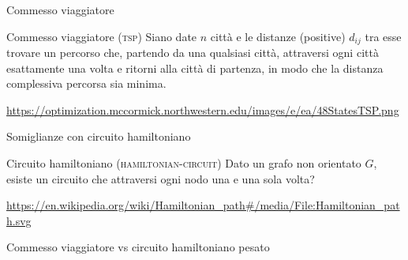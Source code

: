 \begin{frame}{Commesso viaggiatore}

\vspace{-9pt}
\begin{block}{Commesso viaggiatore (\textsc{tsp})}
Siano date $n$ città e le distanze (positive) $d_{ij}$ tra esse
trovare un percorso
che, partendo da una qualsiasi città, attraversi ogni città esattamente una
volta e ritorni alla città di partenza, in modo che la distanza complessiva
percorsa sia minima.
\end{block}

\begin{center}
\end{center}

\vfill
\tiny
\url{https://optimization.mccormick.northwestern.edu/images/e/ea/48StatesTSP.png}


\end{frame}

\begin{frame}{Somiglianze con circuito hamiltoniano}

\vspace{-9pt}
\begin{block}{Circuito hamiltoniano (\textsc{hamiltonian-circuit})}
Dato un grafo non orientato $G$, esiste un circuito che attraversi ogni nodo
una e una sola volta?
\end{block}

\begin{center}
\end{center}

\vfill
\tiny
\url{https://en.wikipedia.org/wiki/Hamiltonian\_path\#/media/File:Hamiltonian\_path.svg}

\end{frame}


\begin{frame}{Commesso viaggiatore vs circuito hamiltoniano pesato}


\end{frame}



